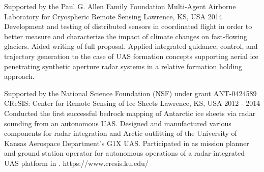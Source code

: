 \begin{cventries}
  \cvprojentry
    {Supported by the Paul G. Allen Family Foundation} %
    {Multi-Agent Airborne Laboratory for Cryospheric Remote Sensing} %
    {Lawrence, KS, USA} %
    {2014} %
    {Development and testing of distributed sensors in coordinated flight in order to better measure and characterize the impact of climate changes on fast-flowing glaciers.} %
    {Aided writing of full proposal. Applied integrated guidance, control, and trajectory generation to the case of UAS formation concepts supporting aerial ice penetrating synthetic aperture radar systems in a relative formation holding approach.} %
    {}
    
  \cvprojentry
    {Supported by the National Science Foundation (NSF) under grant ANT-0424589} %
    {CReSIS: Center for Remote Sensing of Ice Sheets} %
    {Lawrence, KS, USA} %
    {2012 - 2014} %
    {Conducted the first successful bedrock mapping of Antarctic ice sheets via radar sounding from an autonomous UAS.} %
    {Designed and manufactured various components for radar integration and Arctic outfitting of the University of Kansas Aerospace Department's G1X UAS. Participated in  as mission planner and ground station operator for autonomous operations of a radar-integrated UAS platform in .} %
    {https://www.cresis.ku.edu/}

\end{cventries}
